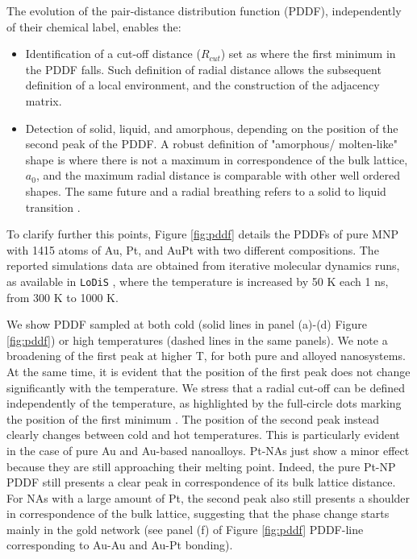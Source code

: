 The evolution of the pair-distance distribution function (PDDF), independently of their chemical label, enables the:
\begin{itemize}
    \item Identification of a cut-off distance ($R_{cut}$) set as where the first minimum in the PDDF falls. Such definition of  radial distance allows the subsequent definition of a local environment, and the construction of the adjacency matrix.
    \item Detection of solid, liquid, and amorphous, depending on the position of the second peak of the PDDF. A robust definition of "amorphous/ molten-like" shape is where there is not a maximum in correspondence of the bulk lattice, $a_0$, and the maximum radial distance is comparable with other well ordered shapes. The same future and a radial breathing refers to a solid to liquid transition \cite{Delgado-Callico2021}.
\end{itemize}
%

To clarify further this points, Figure \ref{fig:pddf} details the PDDFs of pure MNP with 1415 atoms of Au, Pt, and AuPt with two different compositions. The reported simulations data are obtained from iterative molecular dynamics runs, as available in \texttt{LoDiS} \cite{Pavan2018,Rossi2018,LoDiS}, where the temperature is increased by 50 K each 1 ns, from 300 K to 1000 K.
%

We show PDDF sampled at both cold (solid lines in panel (a)-(d) Figure \ref{fig:pddf}) or high temperatures (dashed lines in the same panels). 
We note a broadening of the first peak at higher T, for both pure and alloyed nanosystems. At the same time, it is evident that the position of the first peak does not change significantly with the temperature. 
%
We stress that a radial cut-off can be defined independently of the temperature, as highlighted by the full-circle dots marking the position of the first minimum \cite{Delgado-Callico2021,Zeni2021}.
The position of the second peak instead clearly changes between cold and hot temperatures. 
This is particularly evident in the case of pure Au and Au-based nanoalloys. 
Pt-NAs just show a minor effect because they are still approaching their melting point. Indeed, the pure Pt-NP PDDF still presents a clear peak in correspondence of its bulk lattice distance. 
For NAs with a large amount of Pt, the second peak also still presents a shoulder in correspondence of the bulk lattice, suggesting that the phase change starts mainly in the gold network (see panel (f) of Figure \ref{fig:pddf} PDDF-line corresponding to Au-Au and Au-Pt bonding). 

